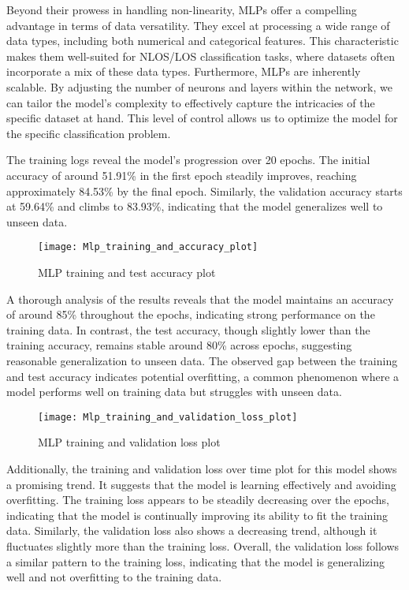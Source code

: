 \documentclass[
	a4paper, %
	11pt, %
]{CSUniSchoolLabReport}
\begin{document}
Beyond their prowess in handling non-linearity, MLPs offer a compelling advantage in terms of data versatility. They excel at processing a wide range of data types, including both numerical and categorical features. This characteristic makes them well-suited for NLOS/LOS classification tasks, where datasets often incorporate a mix of these data types. Furthermore, MLPs are inherently scalable. By adjusting the number of neurons and layers within the network, we can tailor the model's complexity to effectively capture the intricacies of the specific dataset at hand. This level of control allows us to optimize the model for the specific classification problem.

The training logs reveal the model's progression over 20 epochs. The initial accuracy of around 51.91\% in the first epoch steadily improves, reaching approximately 84.53\% by the final epoch. Similarly, the validation accuracy starts at 59.64\% and climbs to 83.93\%, indicating that the model generalizes well to unseen data. 

\begin{figure}[H] 
	\centering
	\texttt{[image: Mlp\_training\_and\_accuracy\_plot]}
	\caption{MLP training and test accuracy plot}\label{fig:frequency_graph}
\end{figure}

A thorough analysis of the results reveals that the model maintains an accuracy of around 85\% throughout the epochs, indicating strong performance on the training data. In contrast, the test accuracy, though slightly lower than the training accuracy, remains stable around 80\% across epochs, suggesting reasonable generalization to unseen data. The observed gap between the training and test accuracy indicates potential overfitting, a common phenomenon where a model performs well on training data but struggles with unseen data.

\begin{figure}[H] 
	\centering
	\texttt{[image: Mlp\_training\_and\_validation\_loss\_plot]}
	\caption{MLP training and validation loss plot}\label{fig:frequency_graph}
\end{figure}

Additionally, the training and validation loss over time plot for this model shows a promising trend. It suggests that the model is learning effectively and avoiding overfitting. The training loss appears to be steadily decreasing over the epochs, indicating that the model is continually improving its ability to fit the training data. Similarly, the validation loss also shows a decreasing trend, although it fluctuates slightly more than the training loss. Overall, the validation loss follows a similar pattern to the training loss, indicating that the model is generalizing well and not overfitting to the training data.
\end{document}
